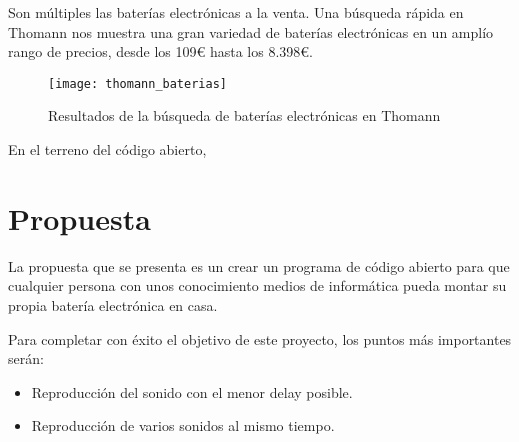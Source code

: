         Son múltiples las baterías electrónicas a la venta. Una búsqueda rápida en Thomann\cite{thomann_baterias} nos
        muestra una gran variedad de baterías electrónicas en un amplío rango de precios, desde los 109\euro{} hasta los
        8.398\euro{}.

        \begin{figure}[ht]
            \centering
            \texttt{[image: thomann\_baterias]}
            \caption{Resultados de la búsqueda de baterías electrónicas en Thomann}
        \end{figure}

        En el terreno del código abierto, %
    

    \section{Propuesta} %
    \label{sec:Propuesta}

        La propuesta que se presenta es un crear un programa de código abierto para que cualquier persona con unos
        conocimiento medios de informática pueda montar su propia batería electrónica en casa.
        
        Para completar con éxito el objetivo de este proyecto, los puntos más importantes serán:
        \begin{itemize}
            \item Reproducción del sonido con el menor delay posible.
            \item Reproducción de varios sonidos al mismo tiempo.
        \end{itemize}
    

